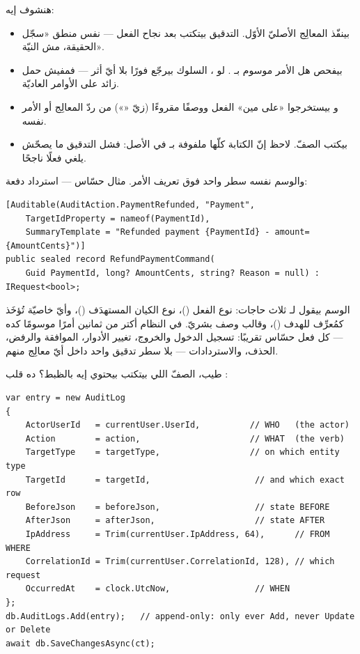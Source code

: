 هنشوف إيه:
\begin{itemize}
\item {} بينفّذ المعالِج الأصليّ الأوّل. التدقيق بيتكتب
  بعد نجاح الفعل — نفس منطق «سجّل الحقيقة، مش النيّة».
\item {} بيفحص هل الأمر موسوم بـ
  \code{[Auditable]}. لو ، السلوك بيرجّع فورًا بلا أيّ أثر — فمفيش
  حمل زائد على الأوامر العاديّة.
\item {} و بيستخرجوا «على مين» الفعل ووصفًا
  مقروءًا (زيّ «») من ردّ المعالِج أو الأمر نفسه.
\item {} بيكتب الصفّ. لاحظ إنّ الكتابة كلّها ملفوفة بـ
   في الأصل: فشل التدقيق ما يصحّش يلغي فعلًا ناجحًا.
\end{itemize}

والوسم نفسه سطر واحد فوق تعريف الأمر. مثال حسّاس — استرداد دفعة:

\begin{english}
\begin{lstlisting}[language={[Sharp]C}]
[Auditable(AuditAction.PaymentRefunded, "Payment",
    TargetIdProperty = nameof(PaymentId),
    SummaryTemplate = "Refunded payment {PaymentId} - amount={AmountCents}")]
public sealed record RefundPaymentCommand(
    Guid PaymentId, long? AmountCents, string? Reason = null) : IRequest<bool>;
\end{lstlisting}
\end{english}

الوسم بيقول لـ ثلاث حاجات: نوع الفعل ()،
نوع الكيان المستهدَف ()، وأيّ خاصيّة تُؤخَذ كمُعرِّف للهدف
()، وقالب وصف بشريّ. في النظام أكتر من ثمانين أمرًا موسومًا كده —
كل فعل حسّاس تقريبًا: تسجيل الدخول والخروج، تغيير الأدوار، الموافقة والرفض، الحذف،
والاستردادات — بلا سطر تدقيق واحد داخل أيّ معالِج منهم.

طيب، الصفّ اللي بيتكتب بيحتوي إيه بالظبط؟ ده قلب :

\begin{english}
\begin{lstlisting}[language={[Sharp]C}]
var entry = new AuditLog
{
    ActorUserId   = currentUser.UserId,          // WHO   (the actor)
    Action        = action,                      // WHAT  (the verb)
    TargetType    = targetType,                  // on which entity type
    TargetId      = targetId,                     // and which exact row
    BeforeJson    = beforeJson,                   // state BEFORE
    AfterJson     = afterJson,                    // state AFTER
    IpAddress     = Trim(currentUser.IpAddress, 64),      // FROM WHERE
    CorrelationId = Trim(currentUser.CorrelationId, 128), // which request
    OccurredAt    = clock.UtcNow,                 // WHEN
};
db.AuditLogs.Add(entry);   // append-only: only ever Add, never Update or Delete
await db.SaveChangesAsync(ct);
\end{lstlisting}
\end{english}

